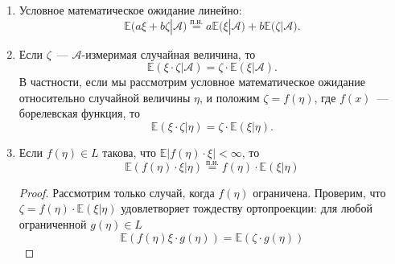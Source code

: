     \vspace{1cm}
    \begin{namedthm}\leavevmode
        \begin{enumerate}
            \item 
                Условное математическое ожидание линейно:
                \begin{equation*}
                    \mathbb{E} \bigl(a \xi + b \zeta | \mathcal{A}\bigr) \overset{\text{п.н.}}{=} a \mathbb{E} \bigl(\xi | \mathcal{A}\bigr) + b \mathbb{E} \bigl(\zeta | \mathcal{A}\bigr).
                \end{equation*}
            \item
                Если $\zeta$~--- $\mathcal{A}$-измеримая случайная величина, то 
                \begin{equation*}
                    \mathbb{E}\left( \xi \cdot \zeta | \mathcal{A}\right) = \zeta \cdot \mathbb{E}\left(\xi | \mathcal{A}\right).
                \end{equation*}
                В частности, если мы рассмотрим условное математическое ожидание относительно случайной величины $\eta$, 
                и положим $\zeta = f(\eta)$, где $f(x)$~--- борелевская функция, то 
                \begin{equation*}
                    \mathbb{E}\left( \xi \cdot \zeta | \eta \right) = \zeta \cdot \mathbb{E}\left(\xi | \eta \right).
                \end{equation*}
        \iffalse        
            \item 
                Если $f(\eta) \in L$ такова, что $\mathbb{E}|f(\eta) \cdot \xi|<\infty$, то
                \begin{equation*}
                    \mathbb{E}(f(\eta) \cdot \xi | \eta)
                    \stackrel{\text{п.н.}}{=}
                    f(\eta) \cdot \mathbb{E}(\xi | \eta)
                \end{equation*}
                \begin{proof}
                    Рассмотрим только случай, когда $f(\eta)$ ограничена. 
                    Проверим, что $\zeta=f(\eta) \cdot \mathbb{E}(\xi | \eta)$ удовлетворяет тождеству ортопроекции: для любой ограниченной $g(\eta) \in L$
                    \begin{equation*}
                        \mathbb{E}(f(\eta) \xi \cdot g(\eta))=\mathbb{E}(\zeta \cdot g(\eta))
                    \end{equation*}

\end{proof}
\end{enumerate}
\end{namedthm}
